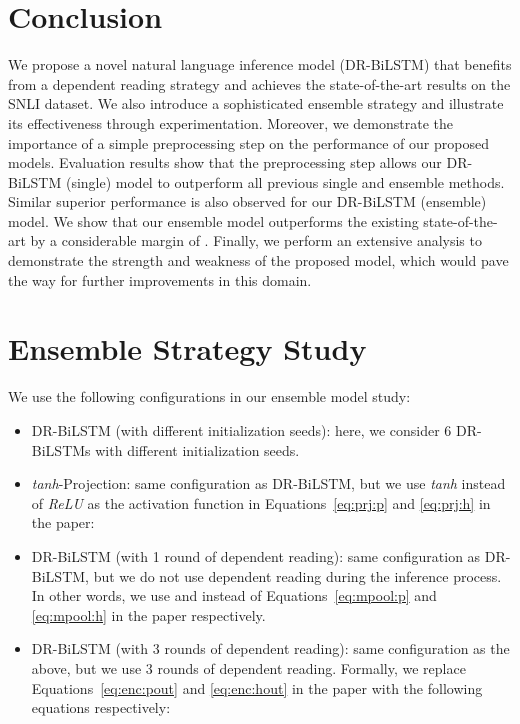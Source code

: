 \documentclass[11pt,a4paper]{article}
\begin{document}
	\section{Conclusion}
	We propose a novel natural language inference model (DR-BiLSTM) that benefits from a dependent reading strategy and achieves the state-of-the-art results on the SNLI dataset. We also introduce a sophisticated ensemble strategy and illustrate its effectiveness through experimentation. Moreover, we demonstrate the importance of a simple preprocessing step on the performance of our proposed models. Evaluation results show that the preprocessing step allows our DR-BiLSTM (single) model to outperform all previous single and ensemble methods. Similar superior performance is also observed for our DR-BiLSTM (ensemble) model. We show that our ensemble model outperforms the existing state-of-the-art by a considerable margin of . Finally, we perform an extensive analysis to demonstrate the strength and weakness of the proposed model, which would pave the way for further improvements in this domain.

	
	
	
	\appendix
	
	\section{Ensemble Strategy Study} 
	\label{app:ensemble:sec}
	We use the following configurations in our ensemble model study:
	
	\begin{itemize}
		\item DR-BiLSTM (with different initialization seeds): here, we consider 6 DR-BiLSTMs with different initialization seeds.
		
		\item \emph{tanh}-Projection:  same configuration as DR-BiLSTM, but we use \emph{tanh} instead of \emph{ReLU} as the activation function in Equations~\ref{eq:prj:p} and \ref{eq:prj:h} in the paper:
		
		
		
		\item DR-BiLSTM (with 1 round of dependent reading): same configuration as DR-BiLSTM, but we do not use dependent reading during the inference process. In other words, we use  and  instead of Equations~\ref{eq:mpool:p} and \ref{eq:mpool:h} in the paper respectively.
		
		\item DR-BiLSTM (with 3 rounds of dependent reading): same configuration as the above, but we use 3 rounds of dependent reading. Formally, we replace Equations~\ref{eq:enc:pout} and \ref{eq:enc:hout} in the paper with the following equations respectively:
		
		
		
		
		
	\end{itemize}
	
\end{document}
